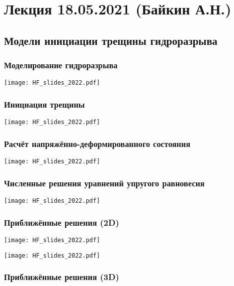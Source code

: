 \documentclass[main.tex]{subfiles}
\begin{document}

\section{Лекция 18.05.2021 (Байкин А.Н.)}

\subsection{Модели инициации трещины гидроразрыва}

\subsubsection{Моделирование гидроразрыва}

\texttt{[image: HF\_slides\_2022.pdf]}

\subsubsection{Инициация трещины}

\texttt{[image: HF\_slides\_2022.pdf]}

\subsubsection{Расчёт напряжённо-деформированного состояния}

\texttt{[image: HF\_slides\_2022.pdf]}

\subsubsection{Численные решения уравнений упругого равновесия}

\texttt{[image: HF\_slides\_2022.pdf]}

\subsubsection{Приближённые решения (2D)}

\texttt{[image: HF\_slides\_2022.pdf]}

\texttt{[image: HF\_slides\_2022.pdf]}

\subsubsection{Приближённые решения (3D)}
\end{document}
